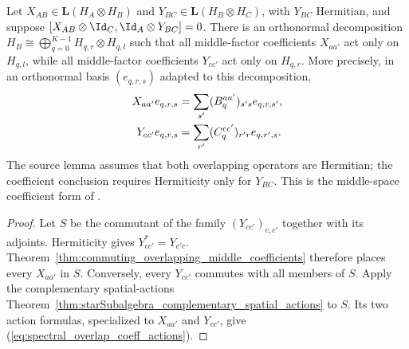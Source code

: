 \begin{theorem}%
    \label{thm:commuting_overlapping_coefficient_spatial_decomposition}
    \leanok
    Let $X_{AB}\in\mathbf L(H_A\otimes H_B)$ and
    $Y_{BC}\in\mathbf L(H_B\otimes H_C)$, with $Y_{BC}$ Hermitian, and
    suppose $[X_{AB}\otimes\Id_C,\Id_A\otimes Y_{BC}]=0$. There is an
    orthonormal decomposition
    $H_B\cong\bigoplus_{q=0}^{K-1}H_{q,r}\otimes H_{q,l}$ such that all
    middle-factor coefficients $X_{aa'}$ act only on $H_{q,l}$, while all
    middle-factor coefficients $Y_{cc'}$ act only on $H_{q,r}$. More
    precisely, in an orthonormal basis $(e_{q,r,s})$ adapted to this
    decomposition,
    \begin{align}
        X_{aa'}e_{q,r,s}
         & =\sum_{s'}(B^{aa'}_q)_{s's}e_{q,r,s'}, \notag \\
        Y_{cc'}e_{q,r,s}
         & =\sum_{r'}(C^{cc'}_q)_{r'r}e_{q,r',s}.
        \label{eq:spectral_overlap_coeff_actions}
    \end{align}
    The source lemma assumes that both overlapping operators are Hermitian;
    the coefficient conclusion requires Hermiticity only for $Y_{BC}$.
    This is the middle-space coefficient form of
    \cite[Lemma~2.1]{Beigi2012Classification}.
\end{theorem}

\begin{proof}
    \leanok
    Let $S$ be the commutant of the family $(Y_{cc'})_{c,c'}$ together with
    its adjoints. Hermiticity gives $Y_{cc'}^*=Y_{c'c}$.
    Theorem~\ref{thm:commuting_overlapping_middle_coefficients} therefore
    places every $X_{aa'}$ in $S$. Conversely, every $Y_{cc'}$ commutes
    with all members of $S$. Apply the complementary spatial-actions
    Theorem~\ref{thm:starSubalgebra_complementary_spatial_actions}
    to $S$. Its two action formulas, specialized to $X_{aa'}$ and $Y_{cc'}$,
    give (\ref{eq:spectral_overlap_coeff_actions}).
\end{proof}

